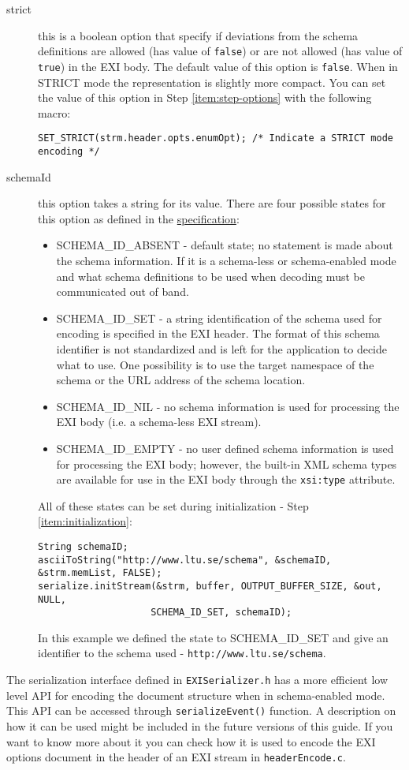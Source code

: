 \begin{description}
 \item[strict] this is a boolean option that specify if deviations from the schema
definitions are allowed (has value of \texttt{false}) or are not allowed (has value of \texttt{true})
in the EXI body. The default value of this option is \texttt{false}. When in STRICT mode
the representation is slightly more compact. You can set the
value of this option in Step \ref{item:step-options} with the following macro:
\begin{lstlisting}
SET_STRICT(strm.header.opts.enumOpt); /* Indicate a STRICT mode encoding */
\end{lstlisting}

 \item[schemaId] this option takes a string for its value. There are four possible states
for this option as defined in the \href{http://www.w3.org/TR/2011/REC-exi-20110310/#key-schemaIdOption}{specification}:
\begin{itemize}
 \item SCHEMA\_ID\_ABSENT - default state; no statement is made about the schema information.
If it is a schema-less or schema-enabled mode and what schema definitions to be used when decoding must be communicated out of band.
 \item SCHEMA\_ID\_SET - a string identification of the schema used for encoding is specified in the EXI header.
The format of this schema identifier is not standardized and is left for the application to decide what to use.
One possibility is to use the target namespace of the schema or the URL address of the schema location.
 \item SCHEMA\_ID\_NIL - no schema information is used for processing the EXI body (i.e. a schema-less EXI stream).
 \item SCHEMA\_ID\_EMPTY - no user defined schema information is used for processing the EXI body; however,
the built-in XML schema types are available for use in the EXI body
through the \texttt{xsi:type} attribute.
\end{itemize}
  All of these states can be set during initialization - Step \ref{item:initialization}:
\begin{lstlisting}
String schemaID;
asciiToString("http://www.ltu.se/schema", &schemaID, &strm.memList, FALSE);
serialize.initStream(&strm, buffer, OUTPUT_BUFFER_SIZE, &out, NULL, 
					SCHEMA_ID_SET, schemaID);                           
\end{lstlisting}
In this example we defined the state to SCHEMA\_ID\_SET and give an identifier to the schema used - \texttt{http://www.ltu.se/schema}.
 \end{description}

The serialization interface defined in \texttt{EXISerializer.h} has a more efficient low level API
for encoding the document structure when in schema-enabled mode. This API can be accessed through \texttt{serializeEvent()}
function. A description on how it can be used might be included in the future versions of this guide. If you want to know more about it
you can check how it is used to encode the EXI options document in the header of an EXI stream in \texttt{headerEncode.c}. 